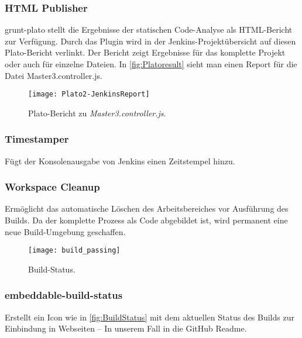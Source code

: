 \subsubsection{HTML Publisher}
grunt-plato stellt die Ergebnisse der statischen Code-Analyse als HTML-Bericht zur Verfügung. Durch das Plugin wird in der Jenkins-Projektübersicht auf diesen Plato-Bericht verlinkt. Der Bericht zeigt Ergebnisse für das komplette Projekt oder auch für einzelne Dateien. In \autoref{fig:Platoresult} sieht man einen Report für die Datei Master3.controller.js.

\begin{figure}[h]
\centering
\texttt{[image: Plato2-JenkinsReport]}
\caption[Plato-Bericht zu \emph{Master3.controller.js}]{Plato-Bericht zu \emph{Master3.controller.js}.}
\label{fig:Platoresult}
\end{figure}

\subsubsection{Timestamper}
Fügt der Konsolenausgabe von Jenkins einen Zeitstempel hinzu.

\subsubsection{Workspace Cleanup}
Ermöglicht das automatische Löschen des Arbeitsbereiches vor Ausführung des Builds. Da der komplette Prozess als Code abgebildet ist, wird permanent eine neue Build-Umgebung geschaffen.

\begin{wrapfigure}[4]{R}{2.5cm}
	\centering
	\texttt{[image: build\_passing]} 
	\caption[Build-Status]{Build-Status.}
	\label{fig:BuildStatus}
\end{wrapfigure}

\subsubsection{embeddable-build-status}
Erstellt ein Icon wie in \autoref{fig:BuildStatus} mit dem aktuellen Status des Builds zur Einbindung in Webseiten -- In unserem Fall in die GitHub Readme.

\begin{wrapfigure}[0]{l}{0cm}
\end{wrapfigure}

